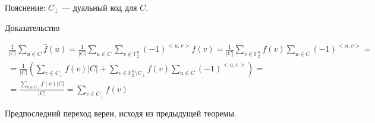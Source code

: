 \documentclass{article}
\begin{document}
Пояснение: $C_\bot$ --- дуальный код для $C$.

Доказательство

\begin{equation*}
\begin{gathered}
\frac{1}{|C|} \sum_{u \in C} \hat{f}(u) = \frac{1}{|C|} \sum_{u \in C} \sum_{v \in \mathbb{F}_2^n} (-1)^{<u, v>} f(v) = \frac{1}{|C|} \sum_{v \in \mathbb{F}_2^n} f(v) \sum_{u \in C}  (-1)^{<u, v>} = \\
= \frac{1}{|C|} \left( \sum_{v \in C_\bot} f(v) |C| + \sum_{v \in \mathbb{F}_2^n \setminus C_\bot} f(v) \sum_{u \in C}  (-1)^{<u, v>} \right) = \\
= \frac{\sum_{v \in C_\bot} f(v) |C|}{|C|} = \sum_{v \in C_\bot} f(v)
\end{gathered}
\end{equation*}

Предпоследний переход верен, исходя из предыдущей теоремы.
\end{document}
